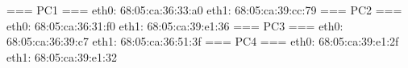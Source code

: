 === PC1 ===
eth0: 68:05:ca:36:33:a0
eth1: 68:05:ca:39:cc:79
=== PC2 ===
eth0: 68:05:ca:36:31:f0
eth1: 68:05:ca:39:e1:36
=== PC3 ===
eth0: 68:05:ca:36:39:c7
eth1: 68:05:ca:36:51:3f 
=== PC4 ===
eth0: 68:05:ca:39:e1:2f
eth1: 68:05:ca:39:e1:32
